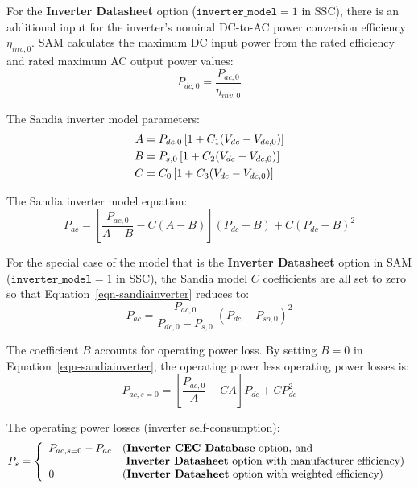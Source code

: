 \documentclass[12pt,letterpaper]{article}
\begin{document}
For the \textbf{Inverter Datasheet} option ($\mathtt{inverter\_model}=1$ in SSC), there is an additional input for the inverter's nominal DC-to-AC power conversion efficiency $\eta_{inv,0}$. SAM calculates the maximum DC input power from the rated efficiency and rated maximum AC output power values:
\begin{equation}
P_{dc,0} = \frac{P_{ac,0}}{\eta_{inv,0}}
\end{equation}

The Sandia inverter model parameters:
\begin{align}
A &=P_{dc,0} \left[ 1+ C_1 ( V_{dc} - V_{dc,0} )\right] \notag\\
B &= P_{s,0}  \left[ 1+ C_2 ( V_{dc} - V_{dc,0} )\right] \notag\\
C &= C_0  \left[ 1+ C_3 ( V_{dc} - V_{dc,0} )\right]
\end{align}

The Sandia inverter model equation:
\begin{equation}\label{eqn-sandiainverter}
P_{ac} = \left[ \frac{P_{ac,0}}{A-B} - C ( A - B ) \right] ( P_{dc} - B ) + C ( P_{dc} - B )^2
\end{equation}

For the special case of the model that is the \textbf{Inverter Datasheet} option in SAM ($\mathtt{inverter\_model} = 1$ in SSC), the Sandia model $C$ coefficients are all set to zero so that Equation~\ref{eqn-sandiainverter} reduces to:
\begin{equation}
P_{ac} = \frac{P_{ac,0}}{P_{dc,0}-P_{s,0}}~( P_{dc} - P_{so,0} )^2
\end{equation}

The coefficient $B$ accounts for operating power loss. By setting $B=0$ in Equation~\ref{eqn-sandiainverter}, the operating power less operating power losses is:
\begin{equation}
P_{ac,s=0} = \left[ \frac{P_{ac,0}}{A} - C A \right] P_{dc} + C P_{dc}^2
\end{equation}

The operating power losses (inverter self-consumption):
\begin{equation}
P_{s} = \left\{
\begin{array}{ll}
P_{ac,s=0} - P_{ac} & \text{(\textbf{Inverter CEC Database} option, and } \\
 & \text{~\textbf{Inverter Datasheet} option with manufacturer efficiency)} \\
0 & \text{(\textbf{Inverter Datasheet} option with weighted efficiency)}
\end{array}
\right.
\end{equation}
\end{document}

